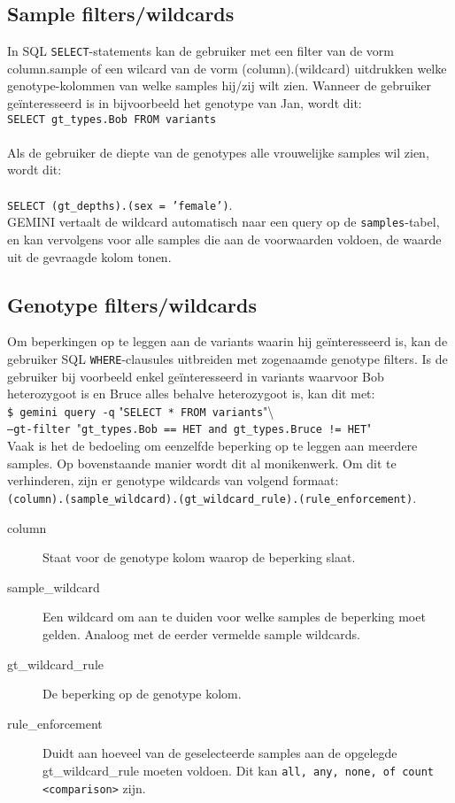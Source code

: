 \subsection{Sample filters/wildcards} 
In SQL \texttt{SELECT}-statements kan de gebruiker met een filter van de vorm column.sample of een wilcard van de vorm (column).(wildcard) uitdrukken welke genotype-kolommen van welke samples hij/zij wilt zien. Wanneer de gebruiker ge\"interesseerd is in bijvoorbeeld het genotype van Jan, wordt dit:\\
\texttt{SELECT gt\_types.Bob FROM variants}\\\\
Als de gebruiker de diepte van de genotypes alle vrouwelijke samples wil zien, wordt dit:\\\\
\texttt{SELECT (gt\_depths).(sex = 'female')}.\\
GEMINI vertaalt de wildcard automatisch naar een query op de \texttt{samples}-tabel, en kan vervolgens voor alle samples die aan de voorwaarden voldoen, de waarde uit de gevraagde kolom tonen.

\subsection{Genotype filters/wildcards}
Om beperkingen op te leggen aan de variants waarin hij ge\"interesseerd is, kan de gebruiker SQL \texttt{WHERE}-clausules uitbreiden met zogenaamde genotype filters. Is de gebruiker bij voorbeeld enkel ge\"interesseerd in variants waarvoor Bob heterozygoot is en Bruce alles behalve heterozygoot is, kan dit met:\\

\noindent\texttt{\$ gemini query -q} "\texttt{SELECT * FROM variants}"\textbackslash \\\texttt{--gt-filter }"\texttt{gt\_types.Bob == HET and gt\_types.Bruce != HET}"\\

\noindent Vaak is het de bedoeling om eenzelfde beperking op te leggen aan meerdere samples. Op bovenstaande manier wordt dit al monikenwerk. Om dit te verhinderen, zijn er genotype wildcards van volgend formaat:\\ 
\texttt{(column).(sample\_wildcard).(gt\_wildcard\_rule).(rule\_enforcement)}.
\begin{description}
\item[column] Staat voor de genotype kolom waarop de beperking slaat.
\item[sample\_wildcard] Een wildcard om aan te duiden voor welke samples de beperking moet gelden. Analoog met de eerder vermelde sample wildcards.
\item[gt\_wildcard\_rule] De beperking op de genotype kolom.
\item[rule\_enforcement] Duidt aan hoeveel van de geselecteerde samples aan de opgelegde gt\_wildcard\_rule moeten voldoen. Dit kan \texttt{all, any, none, of count <comparison>} zijn.
\end{description}

